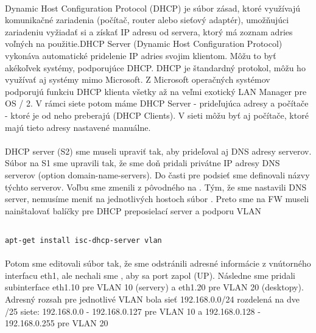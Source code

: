\paragraph{}
Dynamic Host Configuration Protocol (DHCP) je súbor zásad, ktoré využívajú komunikačné zariadenia (počítač, router alebo sieťový adaptér), umožňujúci zariadeniu vyžiadať si a získať IP adresu od servera, ktorý má zoznam adries voľných na použitie.DHCP Server (Dynamic Host Configuration Protocol) vykonáva automatické pridelenie IP adries svojim klientom. Môžu to byť akékoľvek systémy, podporujúce DHCP. DHCP je štandardný protokol, môžu ho využívať aj systémy mimo Microsoft. Z Microsoft operačných systémov podporujú funkciu DHCP klienta všetky až na veľmi exotický LAN Manager pre OS / 2. V rámci siete potom máme DHCP Server - prideľujúca adresy a počítače - ktoré je od neho preberajú (DHCP Clients). V sieti môžu byť aj počítače, ktoré majú tieto adresy nastavené manuálne.

\paragraph{}
DHCP server (S2) sme museli upraviť tak, aby prideľoval aj DNS adresy serverov. Súbor  na S1 sme upravili tak, že sme doň pridali privátne IP adresy DNS serverov (option domain-name-servers). Do časti pre podsieť sme definovali názvy týchto serverov. Voľbu  sme zmenili z pôvodného  na . Tým, že sme nastavili DNS server, nemusíme meniť na jednotlivých hostoch súbor .
Preto sme na FW museli nainštalovať balíčky pre DHCP preposielací server a podporu VLAN

\noindent
{\selectfont
\begin{small}
\begin{verbatim}

apt-get install isc-dhcp-server vlan

\end{verbatim}
\end{small}
}

\paragraph{}
Potom sme editovali súbor  tak, že sme odstránili adresné informácie z vnútorného interfacu eth1, ale nechali sme , aby sa port zapol (UP). Následne sme pridali subinterface eth1.10 pre VLAN 10 (servery) a eth1.20 pre VLAN 20 (desktopy). Adresný rozsah pre jednotlivé VLAN bola sieť 192.168.0.0/24 rozdelená na dve /25 siete: 192.168.0.0 - 192.168.0.127 pre VLAN 10 a 192.168.0.128 - 192.168.0.255 pre VLAN 20

